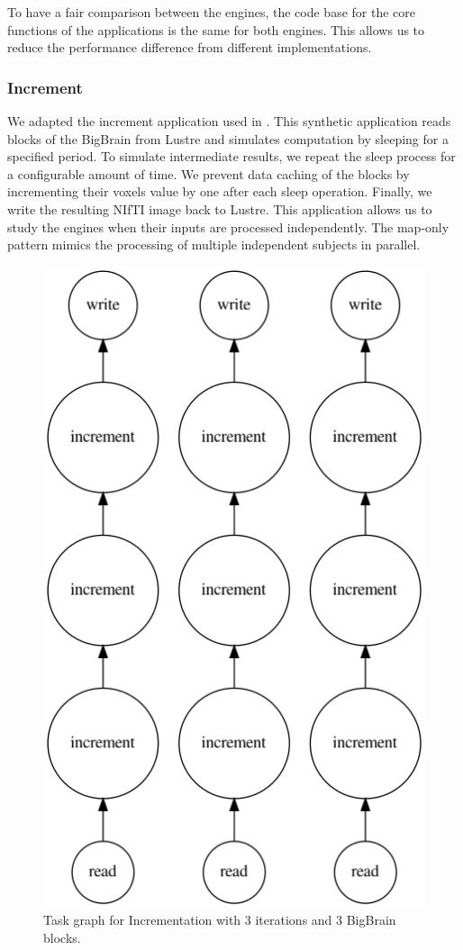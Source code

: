 \documentclass[conference]{IEEEtran}
\begin{document}
To have a fair comparison between the engines, the code base for the core functions of the applications is the same for both engines.
This allows us to reduce the performance difference from different implementations.
		
\subsubsection{Increment}
We adapted the increment application used in \cite{hayot2019performance}.
This synthetic application reads blocks of the BigBrain from Lustre and
simulates computation by sleeping for a specified period. To simulate
intermediate results, we repeat the sleep process for a configurable amount
of time. We prevent data caching of the blocks by incrementing their voxels
value by one after each sleep operation. Finally, we write the resulting
NIfTI image back to Lustre. This application allows us to study the engines
when their inputs are processed independently. The map-only pattern
mimics the processing of multiple independent subjects in parallel.
\begin{figure}[!ht]
	\centering
	\includegraphics[height=\columnwidth,
	angle=0]{figures/increment.png}
	\caption{Task graph for Incrementation with 3 iterations and 3 BigBrain blocks.}
	\label{fig:graph-increment}
\end{figure}
			
\end{document}
